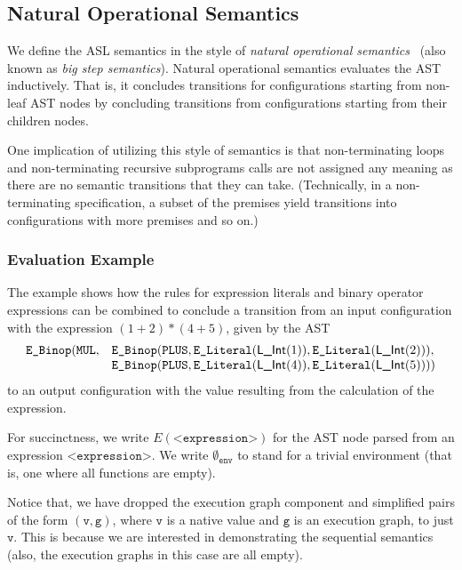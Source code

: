 \documentclass{book}
\newcommand\emptyenv[0]{\emptyset_{\env}}
\newcommand\env[0]{\texttt{env}}
\newcommand\vg[0]{\texttt{g}}
\newcommand\vv[0]{\texttt{v}}
\begin{document}
\subsection{Natural Operational Semantics}
We define the ASL semantics in the style of \emph{natural operational semantics}~\cite{SemanticsWithApplicationsBook}
(also known as \emph{big step semantics}).
Natural operational semantics evaluates the AST inductively.
That is, it concludes transitions for configurations starting from
non-leaf AST nodes by concluding transitions from configurations starting from their children nodes.

One implication of utilizing this style of semantics is that non-terminating loops and non-terminating
recursive subprograms calls are not assigned any meaning as there are no semantic transitions that they can take.
(Technically, in a non-terminating specification, a subset of the premises yield transitions into configurations
with more premises and so on.)

\subsubsection{Evaluation Example}
\newcommand\elint[1]{\texttt{E\_Literal}(\lint(#1))}

The example shows how the rules for expression literals and binary operator expressions can be combined
to conclude a transition from an input configuration with the expression $(1+2)*(4+5)$,
given by the AST
\[
  \begin{array}{rl}
  \texttt{E\_Binop}(\MUL, &\texttt{E\_Binop}(\PLUS, \elint{1}, \elint{2}), \\
                          & \texttt{E\_Binop}(\PLUS, \elint{4}, \elint{5}))
  \end{array}
\]
to an output configuration with the value resulting from the calculation of the expression.

For succinctness, we write $E(\texttt{<expression>})$
for the AST node parsed from an expression $\texttt{<expression>}$.
%
We write $\emptyenv$ to stand for a trivial environment (that is, one where all functions are empty).

Notice that, we have dropped the execution graph component and simplified pairs of the form $(\vv,\vg)$,
where $\vv$ is a native value and $\vg$ is an execution graph, to just $\vv$.
This is because we are interested in demonstrating the sequential semantics (also, the execution graphs
in this case are all empty).
\end{document}
